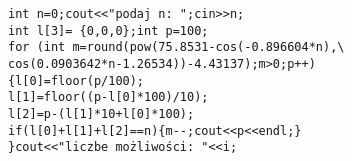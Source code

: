 \begin{verbatim}
int n=0;cout<<"podaj n: ";cin>>n;
int l[3]= {0,0,0};int p=100;
for (int m=round(pow(75.8531-cos(-0.896604*n),\
cos(0.0903642*n-1.26534))-4.43137);m>0;p++)
{l[0]=floor(p/100);
l[1]=floor((p-l[0]*100)/10);
l[2]=p-(l[1]*10+l[0]*100);
if(l[0]+l[1]+l[2]==n){m--;cout<<p<<endl;}
}cout<<"liczbe możliwości: "<<i;
\end{verbatim}